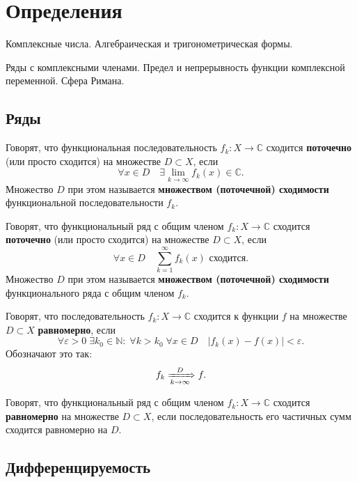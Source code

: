 \section{Определения}

Комплексные числа. Алгебраическая и тригонометрическая формы.

Ряды с комплексными членами. Предел и непрерывность функции комплексной переменной. Сфера Римана.

\subsection{Ряды}

\begin{definition}
Говорят, что функциональная последовательность $f_k : X \to \mathbb{C}$ сходится \textbf{поточечно} (или просто сходится) на множестве $D \subset X$, если
\[
\forall x \in D \quad \exists \lim_{k \to \infty} f_k(x) \in \mathbb{C}.
\]
Множество $D$ при этом называется \textbf{множеством (поточечной) сходимости} функциональной последовательности $f_k$.
\end{definition}

\begin{definition}
Говорят, что функциональный ряд с общим членом $f_k : X \to \mathbb{C}$ сходится \textbf{поточечно} (или просто сходится) на множестве $D \subset X$, если
\[
\forall x \in D \quad \sum_{k=1}^{\infty} f_k(x) \text{ сходится.}
\]
Множество $D$ при этом называется \textbf{множеством (поточечной) сходимости} функционального ряда с общим членом $f_k$.
\end{definition}

\begin{definition}
Говорят, что последовательность $f_k : X \to \mathbb{C}$ сходится к функции $f$ на множестве $D \subset X$ \textbf{равномерно}, если
\[
\forall \varepsilon > 0 \; \exists k_0 \in \mathbb{N} : \; \forall k > k_0 \; \forall x \in D \quad |f_k(x) - f(x)| < \varepsilon.
\]
Обозначают это так:
\[
f_k \xRightarrow[k \to \infty]{D} f.
\]
\end{definition}

\begin{definition}
Говорят, что функциональный ряд с общим членом $f_k : X \to \mathbb{C}$ сходится \textbf{равномерно} на множестве $D \subset X$, если последовательность его частичных сумм сходится равномерно на $D$.
\end{definition}

\subsection{Дифференцируемость}

